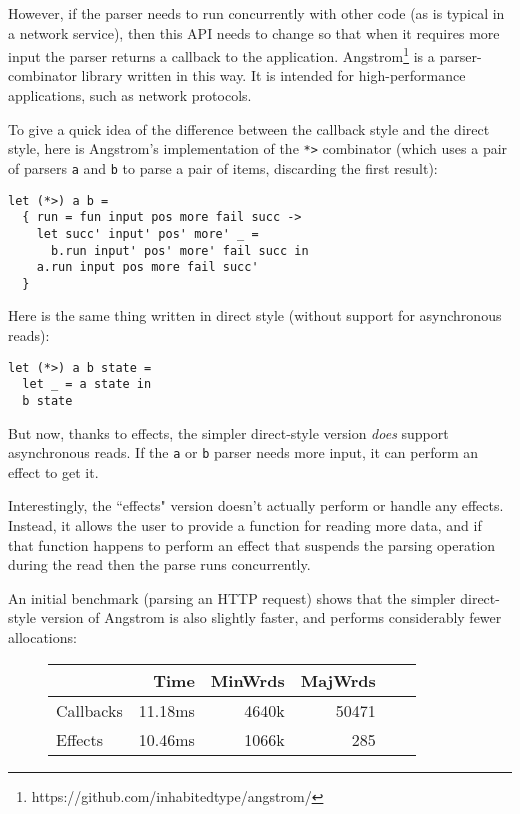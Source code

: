 \documentclass[a4paper,twocolumn]{article}
\begin{document}
However, if the parser needs to run concurrently with other code (as is typical in a network service), then this API needs to change so that when it requires more input the parser returns a callback to the application.
Angstrom\footnote{https://github.com/inhabitedtype/angstrom/} is a parser-combinator library written in this way.
It is intended for high-performance applications, such as network protocols.

To give a quick idea of the difference between the callback style and the direct style, here is Angstrom's implementation of the \verb|*>| combinator (which uses a pair of parsers \verb|a| and \verb|b| to parse a pair of items, discarding the first result):
\begin{lstlisting}[style=ocaml]
let (*>) a b =
  { run = fun input pos more fail succ ->
    let succ' input' pos' more' _ =
      b.run input' pos' more' fail succ in
    a.run input pos more fail succ'
  }
\end{lstlisting}

Here is the same thing written in direct style (without support for asynchronous reads):
\begin{lstlisting}[style=ocaml]
let (*>) a b state =
  let _ = a state in
  b state
\end{lstlisting}


But now, thanks to effects, the simpler direct-style version \emph{does} support asynchronous reads.
If the \verb|a| or \verb|b| parser needs more input, it can perform an effect to get it.

Interestingly, the ``effects" version doesn't actually perform or handle any effects.
Instead, it allows the user to provide a function for reading more data,
and if that function happens to perform an effect that suspends the parsing operation during the read
then the parse runs concurrently.

An initial benchmark (parsing an HTTP request) shows that the simpler direct-style version of Angstrom is also slightly faster, and performs considerably fewer allocations:

\begin{figure}[h]
\begin{tabular}{l|rrrrr}
          & Time     & MinWrds &  MajWrds \\
\hline
Callbacks & 11.18ms  & 4640k   &    50471 \\
Effects   & 10.46ms  & 1066k   &      285 \\
\end{tabular}
\end{figure}
\end{document}
